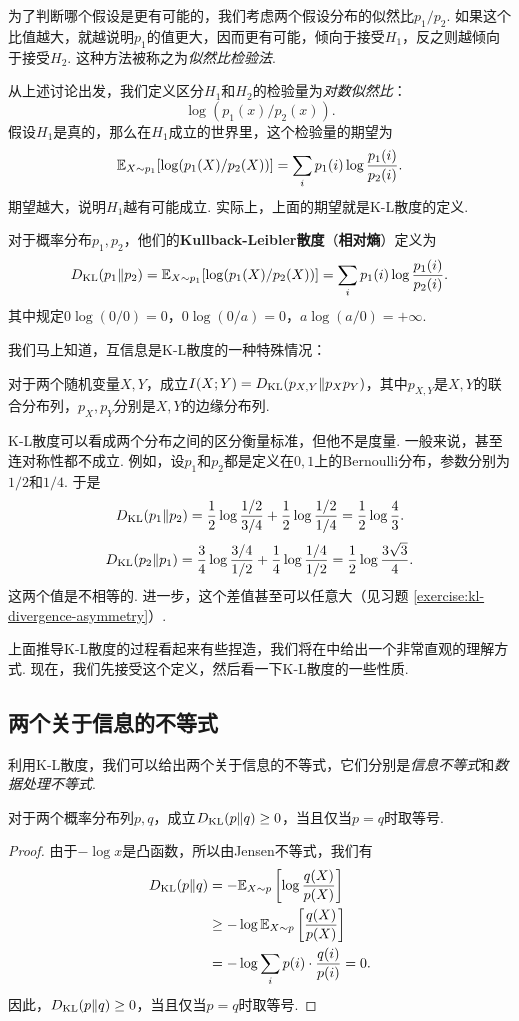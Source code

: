 为了判断哪个假设是更有可能的，我们考虑两个假设分布的似然比$p_1/p_2$. 如果这个比值越大，就越说明$p_1$的值更大，因而更有可能，倾向于接受$H_1$，反之则越倾向于接受$H_2$. 这种方法被称之为\textit{似然比检验法}.

从上述讨论出发，我们定义区分$H_1$和$H_2$的检验量为\textit{对数似然比}：
\[\log(p_1(x)/p_2(x)).\]
假设$H_1$是真的，那么在$H_1$成立的世界里，这个检验量的期望为
    \[\mathbb{E}_{X\sim p_1}[\log(p_1(X)/p_2(X))]=\sum_ip_1(i)\log\frac{p_1(i)}{p_2(i)}.\]
期望越大，说明$H_1$越有可能成立. 实际上，上面的期望就是K-L散度的定义.
\begin{definition}
    对于概率分布$p_1,p_2$，他们的\textbf{Kullback-Leibler散度}（\textbf{相对熵}）定义为
    \[D_{\mathrm{KL}}(p_1\| p_2)=\mathbb{E}_{X\sim p_1}[\log(p_1(X)/p_2(X))]=\sum_ip_1(i)\log\frac{p_1(i)}{p_2(i)}.\]
其中规定$0\log(0/0)=0$，$0\log(0/a)=0$，$a\log(a/0)=+\infty$.
\end{definition}
我们马上知道，互信息是K-L散度的一种特殊情况：
\begin{proposition}\label{proposition:mutual-information-kl-divergence}
    对于两个随机变量$X,Y$，成立$I(X;Y)=D_{\mathrm{KL}}(p_{X,Y}\|p_Xp_Y)$，其中$p_{X,Y}$是$X,Y$的联合分布列，$p_X,p_Y$分别是$X,Y$的边缘分布列.
\end{proposition}

K-L散度可以看成两个分布之间的区分衡量标准，但他不是度量. 一般来说，甚至连对称性都不成立. 例如，设$p_1$和$p_2$都是定义在$0,1$上的Bernoulli分布，参数分别为$1/2$和$1/4$. 于是
\[D_{\mathrm{KL}}(p_1\Vert p_2) = \frac12\log\frac{1/2}{3/4} + \frac12\log\frac{1/2}{1/4} = \frac12\log\frac43.\]
\[D_{\mathrm{KL}}(p_2\Vert p_1) = \frac34\log\frac{3/4}{1/2} + \frac14\log\frac{1/4}{1/2} = \frac12\log\frac{3\sqrt3}{4}.\]
这两个值是不相等的. 进一步，这个差值甚至可以任意大（见习题 \ref{exercise:kl-divergence-asymmetry}）.

上面推导K-L散度的过程看起来有些捏造，我们将在中给出一个非常直观的理解方式. 现在，我们先接受这个定义，然后看一下K-L散度的一些性质.

\subsection{两个关于信息的不等式}
利用K-L散度，我们可以给出两个关于信息的不等式，它们分别是\textit{信息不等式}和\textit{数据处理不等式}.

\begin{theorem}[信息不等式]\label{theorem:information-inequality}
    对于两个概率分布列$p,q$，成立$D_{\mathrm{KL}}(p\Vert q)\geq0$，当且仅当$p=q$时取等号.
\end{theorem}
\begin{proof}
    由于$-\log x$是凸函数，所以由Jensen不等式，我们有
    \begin{align*}
        D_{\mathrm{KL}}(p\Vert q)&=-\mathbb{E}_{X\sim p}\left[\log\frac{q(X)}{p(X)}\right]\\
        &\geq-\log \mathbb{E}_{X\sim p}\left[\frac{q(X)}{p(X)}\right]\\
        &=-\log\sum_ip(i)\cdot\frac{q(i)}{p(i)}=0.
    \end{align*}
    因此，$D_{\mathrm{KL}}(p\Vert q)\geq0$，当且仅当$p=q$时取等号.
\end{proof}

